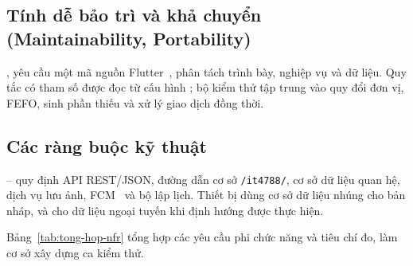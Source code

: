 \subsection{Tính dễ bảo trì và khả chuyển (Maintainability, Portability)}\label{ssec:nfr-bao-tri}

,  yêu cầu một mã nguồn Flutter~\cite{flutter}, phân tách trình bày, nghiệp vụ và dữ liệu. Quy tắc có tham số được đọc từ cấu hình ; bộ kiểm thử tập trung vào quy đổi đơn vị, FEFO, sinh phần thiếu và xử lý giao dịch đồng thời.

\subsection{Các ràng buộc kỹ thuật}\label{ssec:nfr-rang-buoc}

-- quy định API REST/JSON, đường dẫn cơ sở \texttt{/it4788/}, cơ sở dữ liệu quan hệ, dịch vụ lưu ảnh, FCM~\cite{fcm} và bộ lập lịch. Thiết bị dùng cơ sở dữ liệu nhúng cho bản nháp, và cho dữ liệu ngoại tuyến khi định hướng  được thực hiện.

Bảng~\ref{tab:tong-hop-nfr} tổng hợp các yêu cầu phi chức năng và tiêu chí đo, làm cơ sở xây dựng ca kiểm thử.


